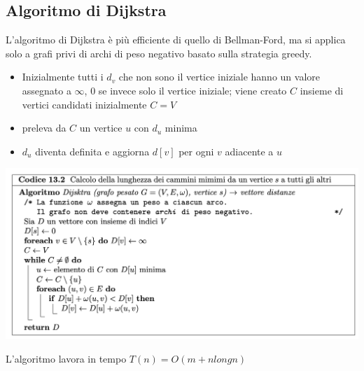\documentclass[11pt, oneside]{article}   	%
\begin{document}
\subsection*{Algoritmo di Dijkstra}
L'algoritmo di Dijkstra è più efficiente di quello di Bellman-Ford, ma si applica solo a grafi privi di archi di peso negativo basato sulla strategia greedy. \begin{itemize}
\item Inizialmente tutti i $d_v$ che non sono il vertice iniziale hanno un valore assegnato a $\infty$, 0 se invece solo il vertice iniziale; viene creato $C$ insieme di vertici candidati inizialmente $C= V$
\item preleva da $C$ un vertice $u$ con $d_u$ minima
\item $d_u$ diventa definita e aggiorna $d[v]$ per ogni $v$ adiacente a $u$
\end{itemize}
\begin{center}
\includegraphics[scale=0.6]{dijkstra}
\end{center}
L'algoritmo lavora in tempo $T(n) = O(m + nlongn)$
\end{document}
